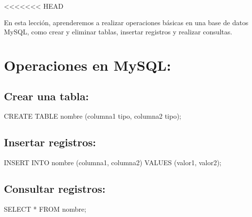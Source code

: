 \documentclass[
  a4paper,
  DIV=11,
  numbers=noendperiod,
  onepage,
  openany]{scrreprt}
\newenvironment{Shaded}{\begin{snugshade}}{\end{snugshade}}
\newcommand{\KeywordTok}[1]{\textcolor[rgb]{0.00,0.23,0.31}{#1}}
\newcommand{\NormalTok}[1]{\textcolor[rgb]{0.00,0.23,0.31}{#1}}
\newcommand{\OperatorTok}[1]{\textcolor[rgb]{0.37,0.37,0.37}{#1}}
\begin{document}
\textless\textless\textless\textless\textless\textless\textless{} HEAD

En esta lección, aprenderemos a realizar operaciones básicas en una base
de datos MySQL, como crear y eliminar tablas, insertar registros y
realizar consultas.

\hypertarget{operaciones-en-mysql}{%
\section{Operaciones en MySQL:}\label{operaciones-en-mysql}}

\hypertarget{crear-una-tabla-2}{%
\subsection{Crear una tabla:}\label{crear-una-tabla-2}}

\begin{Shaded}
\begin{Highlighting}[]
\KeywordTok{CREATE} \KeywordTok{TABLE}\NormalTok{ nombre (columna1 tipo, columna2 tipo);}
\end{Highlighting}
\end{Shaded}

\hypertarget{insertar-registros-2}{%
\subsection{Insertar registros:}\label{insertar-registros-2}}

\begin{Shaded}
\begin{Highlighting}[]
\KeywordTok{INSERT} \KeywordTok{INTO}\NormalTok{ nombre (columna1, columna2) }\KeywordTok{VALUES}\NormalTok{ (valor1, valor2);}
\end{Highlighting}
\end{Shaded}

\hypertarget{consultar-registros-2}{%
\subsection{Consultar registros:}\label{consultar-registros-2}}

\begin{Shaded}
\begin{Highlighting}[]
\KeywordTok{SELECT} \OperatorTok{*} \KeywordTok{FROM}\NormalTok{ nombre;}
\end{Highlighting}
\end{Shaded}
\end{document}
